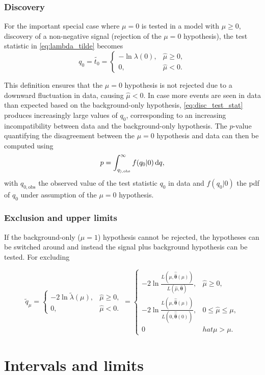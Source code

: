 \subsubsection{Discovery}
For the important special case where $\mu = 0$ is tested in a model with $\mu \geq 0$, \ie discovery of a non-negative signal (rejection of the $\mu = 0$ hypothesis), the test statistic in \cref{eq:lambda_tilde} becomes
\begin{equation}
	q_0 = \tilde{t_0} = 
\begin{cases}
    -\ln{\lambda(0)}, & \hat{\mu} \geq 0,\\
    0,              & \hat{\mu} < 0.
\end{cases}
\label{eq:disc_test_stat}
\end{equation}

This definition ensures that the $\mu = 0$ hypothesis is not rejected due to a downward fluctuation in data, causing $\hat{\mu} < 0$. In case more events are seen in data than expected based on the background-only hypothesis, \cref{eq:disc_test_stat} produces increasingly large values of $q_0$, corresponding to an increasing incompatibility between data and the background-only hypothesis. The $p$-value quantifying the disagreement between the $\mu = 0$ hypothesis and data can then be computed using
\begin{equation}
		p = \int_{q_{),\mathrm{obs}}}^{\infty}{f(q_0\vert 0)\mathop{}\!\mathrm{d} q},
\end{equation}
with $q_{0,\mathrm{obs}}$ the observed value of the test statistic $q_0$ in data and $f(q_0\vert 0)$ the \gls{pdf} of $q_0$ under assumption of the $\mu=0$ hypothesis.

\subsubsection{Exclusion and upper limits}
If the background-only ($\mu=1$) hypothesis cannot be rejected, the hypotheses can be switched around and instead the signal plus background hypothesis can be tested. For excluding  

\begin{equation}
	\tilde{q}_\mu = 
\begin{cases}
    -2\ln{\tilde{\lambda}(\mu)}, & \hat{\mu} \geq 0,\\
    0,              & \hat{\mu} < 0.
\end{cases} =
\begin{cases}
    -2 \ln{\frac{L(\mu,\boldsymbol{\hat{\hat{\theta}}}(\mu))}{L(\hat{\mu},\hat{\boldsymbol{\theta}})}}, & \hat{\mu} \geq 0,\\
    -2 \ln{\frac{L(\mu,\boldsymbol{\hat{\hat{\theta}}}(\mu))}{L(0,\boldsymbol{\hat{\hat{\theta}}}(0))}},              & 0 \leq \hat{\mu} \leq \mu, \\
    0  & hat{\mu} > \mu.
\end{cases}
\end{equation}


\section{Intervals and limits}

















